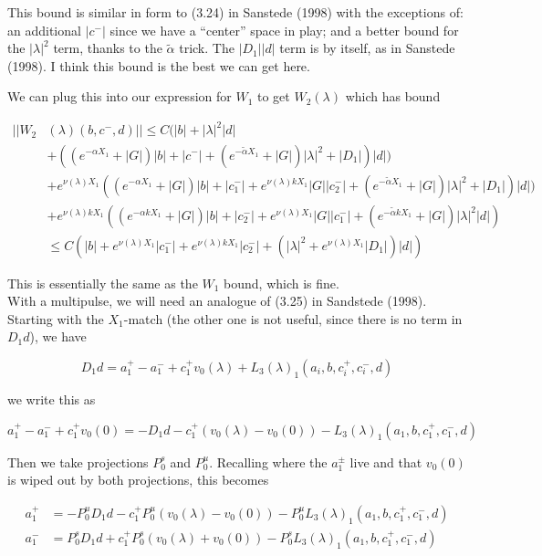 \documentclass[12pt]{article}
\begin{document}
\begin{enumerate}
This bound is similar in form to (3.24) in Sanstede (1998) with the exceptions of: an additional $|c^-|$ since we have a ``center'' space in play; and a better bound for the $|\lambda|^2$ term, thanks to the $\tilde{\alpha}$ trick. The $|D_1| |d| $ term is by itself, as in Sanstede (1998). I think this bound is the best we can get here.

We can plug this into our expression for $W_1$ to get $W_2(\lambda)$ which has bound

\begin{align*}
||W_2&(\lambda)(b,c^-,d)|| \leq C (|b| + |\lambda|^2 |d|\\
&+ ( (e^{-\alpha X_1} + |G|) |b| + |c^-| + (e^{-\tilde{\alpha} X_1} + |G|) |\lambda|^2 + |D_1|) |d| ) \\
&+ e^{\nu(\lambda)X_1} ((e^{-\alpha X_1} + |G|) |b| + |c_1^-| + e^{\nu(\lambda)k X_1} |G||c_2^-| + (e^{-\tilde{\alpha} X_1} + |G|) |\lambda|^2 + |D_1|)|d| ) \\
&+ e^{\nu(\lambda)k X_1} ((e^{-\alpha k X_1} + |G|) |b| + |c_2^-| + e^{\nu(\lambda) X_1} |G||c_1^-| + (e^{-\tilde{\alpha} k X_1} + |G|) |\lambda|^2 |d| ) \\
&\leq C( |b| + e^{\nu(\lambda) X_1} |c_1^-| +  e^{\nu(\lambda) k X_1} |c_2^-| + (|\lambda|^2 + e^{\nu(\lambda) X_1} |D_1|) |d| )
\end{align*}

This is essentially the same as the $W_1$ bound, which is fine.\\

With a multipulse, we will need an analogue of (3.25) in Sandstede (1998). Starting with the $X_1$-match (the other one is not useful, since there is no term in $D_1 d$), we have

\[
D_1 d = a_1^+ - a_1^- + c_1^+ v_0(\lambda) + L_3(\lambda)_1(a_i, b, c_i^+, c_i^-, d)
\]

we write this as

\[
a_1^+ - a_1^- + c_1^+ v_0(0) = -D_1 d - c_1^+ (v_0(\lambda) - v_0(0)) - L_3(\lambda)_1(a_1, b, c_1^+, c_1^-, d)
\]

Then we take projections $P^s_0$ and $P^u_0$. Recalling where the $a_1^\pm$ live and that $v_0(0)$ is wiped out by both projections, this becomes 

\begin{align*}
a_1^+ &= -P^u_0 D_1 d - c_1^+ P^u_0 (v_0(\lambda) - v_0(0)) - P^u_0 L_3(\lambda)_1(a_1, b, c_1^+, c_1^-, d) \\
a_1^- &=  P^s_0 D_1 d + c_1^+ P^s_0 (v_0(\lambda) + v_0(0)) - P^s_0 L_3(\lambda)_1(a_1, b, c_1^+, c_1^-, d)
\end{align*}


\end{enumerate}
\end{document}
